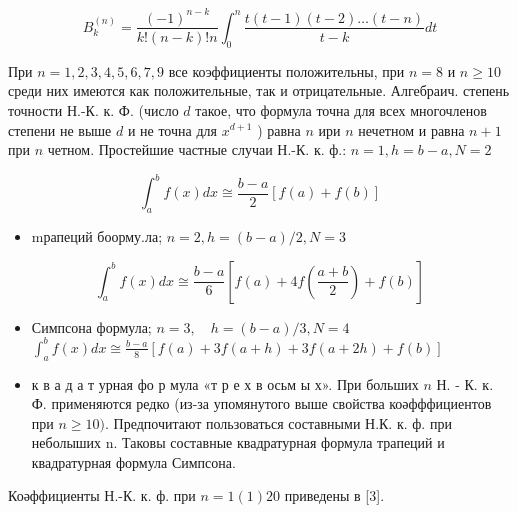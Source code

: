 \documentclass[10pt]{article}
\begin{document}
\[

B_{k}^{(n)}=\frac{(-1)^{n-k}}{k !(n-k) ! n} \int_{0}^{n} \frac{t(t-1)(t-2) \ldots(t-n)}{t-k} d t

\]



При $n=1,2,3,4,5,6,7,9$ все коэффициенты положительны, при $n=8$ и $n \geqslant 10$ среди них имеются как положительные, так и отрицательные. Алгебраич. степень точности Н.-К. к. Ф. (число $d$ такое, что формула точна для всех многочленов степени не выше $d$ и не точна для $x^{d+1}$ ) равна $n$ ири $n$ нечетном и равна $n+1$ при $n$ четном. Простейшие частные случаи Н.-К. к. ф.: $n=1, h=b-a, N=2$



\[

\int_{a}^{b} f(x) d x \cong \frac{b-a}{2}[f(a)+f(b)]

\]



\begin{itemize}

  \item mрапеций боорму.ла; $n=2, h=(b-a) / 2, N=3$

\end{itemize}



\[

\int_{a}^{b} f(x) d x \cong \frac{b-a}{6}\left[f(a)+4 f\left(\frac{a+b}{2}\right)+f(b)\right]

\]



\begin{itemize}

  \item Симпсона формула; $n=3, \quad h=(b-a) / 3, N=4$ $\int_{a}^{b} f(x) d x \cong \frac{b-a}{8}[f(a)+3 f(a+h)+3 f(a+2 h)+f(b)]$



  \item к в а д а т урная фо р мула «т р е х в осьм ы х». При больших $n$ Н. - К. к. Ф. применяются редко (из-за упомянутого выше свойства коәфффициентов при $n \geqslant 10)$. Предпочитают пользоваться составными Н.К. к. ф. при неболыших n. Таковы составные квадратурная формула трапеций и квадратурная формула Симпсона.



\end{itemize}



Коәффициенты Н.-К. к. ф. при $n=1(1) 20$ приведены в [3].
\end{document}
